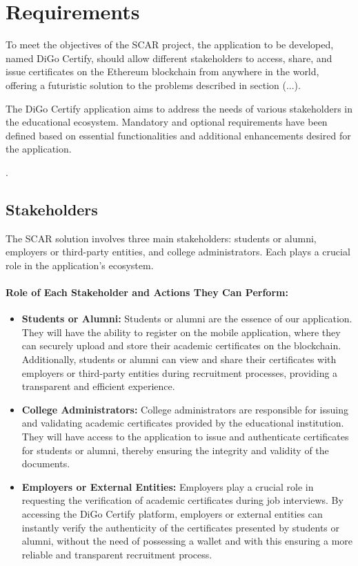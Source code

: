 %
%
\chapter{Requirements}\label{chap:requirements}

To meet the objectives of the SCAR project, the application to be developed, named DiGo Certify, should allow different stakeholders to access, share, and issue certificates on the Ethereum blockchain from anywhere in the world, offering a futuristic solution to the problems described in section (...).

The DiGo Certify application aims to address the needs of various stakeholders in the educational ecosystem. Mandatory and optional requirements have been defined based on essential functionalities and additional enhancements desired for the application.

.



\section{Stakeholders}\label{subsec:stakeholders}
The SCAR solution involves three main stakeholders: students or alumni, employers or third-party entities, and college administrators. Each plays a crucial role in the application's ecosystem.

\subsubsection{Role of Each Stakeholder and Actions They Can Perform:}

\begin{itemize}

    \item \textbf{Students or Alumni:} Students or alumni are the essence of our application. They will have the ability to register on the mobile application, where they can securely upload and store their academic certificates on the blockchain. Additionally, students or alumni can view and share their certificates with employers or third-party entities during recruitment processes, providing a transparent and efficient experience.

    \item \textbf{College Administrators:} College administrators are responsible for issuing and validating academic certificates provided by the educational institution. They will have access to the application to issue and authenticate certificates for students or alumni, thereby ensuring the integrity and validity of the documents.

    \item \textbf{Employers or External Entities:} Employers play a crucial role in requesting the verification of academic certificates during job interviews. By accessing the DiGo Certify platform, employers or external entities can instantly verify the authenticity of the certificates presented by students or alumni, without the need of possessing a wallet and with this ensuring a more reliable and transparent recruitment process.

\end{itemize}

